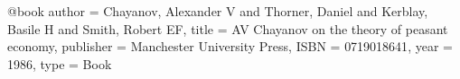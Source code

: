 @book{
   author = {Chayanov, Alexander V and Thorner, Daniel and Kerblay, Basile H and Smith, Robert EF},
   title = {AV Chayanov on the theory of peasant economy},
   publisher = {Manchester University Press},
   ISBN = {0719018641},
   year = {1986},
   type = {Book}
}
